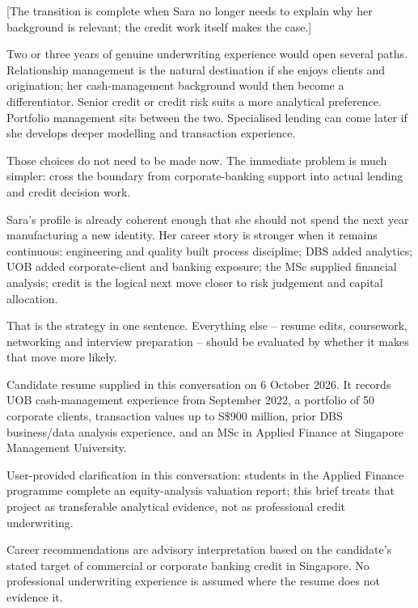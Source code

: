 \documentclass[theme=editorial,publication-type=feature-article]{reportkit}
\begin{document}
[The transition is complete when Sara no longer needs to explain why her background is relevant; the credit work itself makes the case.]

\begin{featurecolumns}
Two or three years of genuine underwriting experience would open several paths. Relationship management is the natural destination if she enjoys clients and origination; her cash-management background would then become a differentiator. Senior credit or credit risk suits a more analytical preference. Portfolio management sits between the two. Specialised lending can come later if she develops deeper modelling and transaction experience.

Those choices do not need to be made now. The immediate problem is much simpler: cross the boundary from corporate-banking support into actual lending and credit decision work.

Sara's profile is already coherent enough that she should not spend the next year manufacturing a new identity. Her career story is stronger when it remains continuous: engineering and quality built process discipline; DBS added analytics; UOB added corporate-client and banking exposure; the MSc supplied financial analysis; credit is the logical next move closer to risk judgement and capital allocation.


That is the strategy in one sentence. Everything else -- resume edits, coursework, networking and interview preparation -- should be evaluated by whether it makes that move more likely.
\end{featurecolumns}

\begin{featurereferences}
\item Candidate resume supplied in this conversation on 6 October 2026. It records UOB cash-management experience from September 2022, a portfolio of 50 corporate clients, transaction values up to S\$900 million, prior DBS business/data analysis experience, and an MSc in Applied Finance at Singapore Management University.
\item User-provided clarification in this conversation: students in the Applied Finance programme complete an equity-analysis valuation report; this brief treats that project as transferable analytical evidence, not as professional credit underwriting.
\item Career recommendations are advisory interpretation based on the candidate's stated target of commercial or corporate banking credit in Singapore. No professional underwriting experience is assumed where the resume does not evidence it.
\end{featurereferences}
\end{document}

